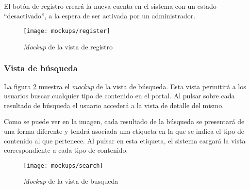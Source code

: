 El botón de registro creará la nueva cuenta en el sistema con un estado ``desactivado'', a la espera de ser activada por un administrador.

\begin{figure}[h]
	\centering
	\texttt{[image: mockups/register]}
	\caption{\textit{Mockup} de la vista de registro}
	\label{fig:mockup_registro}
\end{figure}




\subsubsection{Vista de búsqueda}
La figura \ref{fig:mockup_buscar} muestra el \textit{mockup} de la vista de búsqueda.  Esta vista permitirá a los usuarios buscar cualquier tipo de contenido en el portal.   Al pulsar sobre cada resultado de búsqueda el usuario accederá a la vista de detalle del mismo.

Como se puede ver en la imagen, cada resultado de la búsqueda se presentará de una forma diferente y tendrá asociada una etiqueta en la que se indica el tipo de contenido al que pertenece.  Al pulsar en esta etiqueta, el sistema cargará la vista correspondiente a cada tipo de contenido.

\begin{figure}[h]
	\centering
	\texttt{[image: mockups/search]}
	\caption{\textit{Mockup} de la vista de busqueda}
	\label{fig:mockup_buscar}
\end{figure}